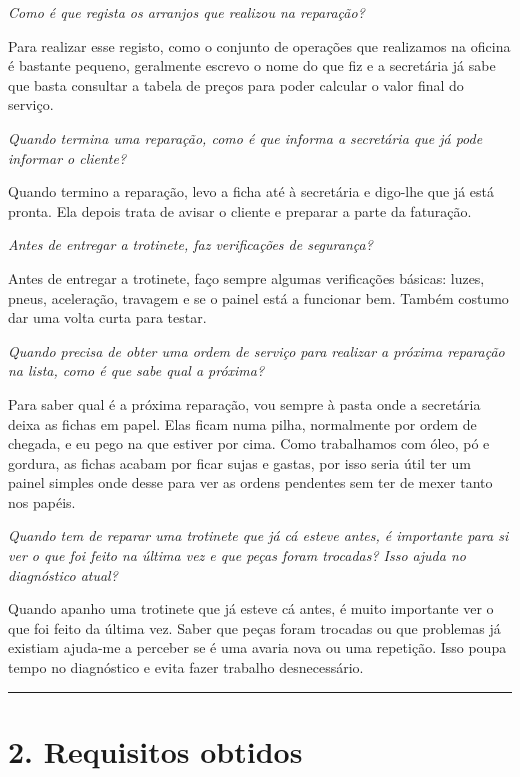 \documentclass[11pt,a4paper]{article}
\newcommand{\pergunta}[1]{\item[P:] \textit{#1}}
\newcommand{\resposta}[1]{\item[R:] #1}
\begin{document}
\begin{transcription}
	\pergunta{Como é que regista os arranjos que realizou na reparação?}
	\resposta{Para realizar esse registo, como o conjunto de operações que realizamos na oficina é bastante pequeno, geralmente escrevo o nome do que fiz e a secretária já sabe que basta consultar a tabela de preços para poder calcular o valor final do serviço.}

	\pergunta{Quando termina uma reparação, como é que informa a secretária que já pode informar o cliente?}
	\resposta{Quando termino a reparação, levo a ficha até à secretária e digo-lhe que já está pronta. Ela depois trata de avisar o cliente e preparar a parte da faturação.}
    
	\pergunta{Antes de entregar a trotinete, faz verificações de segurança?}
	\resposta{Antes de entregar a trotinete, faço sempre algumas verificações básicas: luzes, pneus, aceleração, travagem e se o painel está a funcionar bem. Também costumo dar uma volta curta para testar.}

	\pergunta{Quando precisa de obter uma ordem de serviço para realizar a próxima reparação na lista, como é que sabe qual a próxima?}
	\resposta{Para saber qual é a próxima reparação, vou sempre à pasta onde a secretária deixa as fichas em papel. Elas ficam numa pilha, normalmente por ordem de chegada, e eu pego na que estiver por cima. Como trabalhamos com óleo, pó e gordura, as fichas acabam por ficar sujas e gastas, por isso seria útil ter um painel simples onde desse para ver as ordens pendentes sem ter de mexer tanto nos papéis.}
    
	\pergunta{Quando tem de reparar uma trotinete que já cá esteve antes, é importante para si ver o que foi feito na última vez e que peças foram trocadas? Isso ajuda no diagnóstico atual?}
	\resposta{Quando apanho uma trotinete que já esteve cá antes, é muito importante ver o que foi feito da última vez. Saber que peças foram trocadas ou que problemas já existiam ajuda-me a perceber se é uma avaria nova ou uma repetição. Isso poupa tempo no diagnóstico e evita fazer trabalho desnecessário.}

	\end{transcription}
	
	\vspace{0.5cm}
	\hrule %
	\vspace{0.2cm}
	
	\section*{2. Requisitos obtidos}
	
\end{document}
